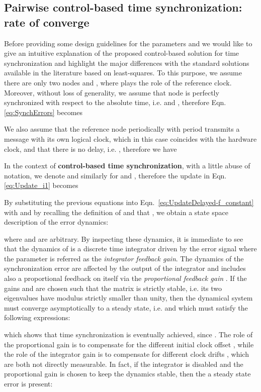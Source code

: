 \documentclass[english,a4paper,10pt,final]{article}
\numberwithin{equation}{section}
\numberwithin{figure}{section}
\begin{document}
\subsection{Pairwise control-based time synchronization: rate of converge}
\label{subsec:pairwise_control}

Before providing some design guidelines for the parameters  and  we would like to give an intuitive explanation of the proposed control-based solution for time synchronization and highlight the major differences with the standard solutions available in the literature based on least-squares. To this purpose, we assume there are only two nodes  and , where  plays the role of the reference clock. Moreover, without loss of generality, we assume that node  is perfectly synchronized with respect to the absolute time, i.e.  and , therefore Eqn.\eqref{eq:SynchErrors} becomes

We also assume that the reference node  periodically with period  transmits a message with its own logical clock, which in this case coincides with the hardware clock, and that there is no delay, i.e. , therefore we have



In the context of \textbf{control-based time synchronization}, with a little abuse of notation, we denote  and similarly for  and , therefore the update in Eqn.\eqref{eq:Update_i1} becomes

By substituting the previous equations into Eqn.~\ref{eq:UpdateDelayed-f_constant} with  and by recalling the definition of  and that , we obtain a state space description of the error dynamics:


where  and  are arbitrary. By inspecting these dynamics, it is immediate to see that the dynamics of  is a discrete time integrator driven by the error signal  where the parameter  is referred as the \emph{integrator feedback gain}. The dynamics of the synchronization error  are affected by the output of the integrator  and includes also a proportional feedback on itself via the \emph{proportional feedback gain} . If the gains  and  are chosen such that the matrix  is strictly stable, i.e. its two eigenvalues have modulus strictly smaller than unity, then the dynamical system must converge asymptotically to a steady state, i.e.  and  which must satisfy the following expressions:

which shows that time synchronization is eventually achieved, since . The role of the proportional gain is to compensate for the different initial clock offset , while the role of the integrator gain is to compensate for different clock drifts , which are both not directly measurable. In fact, if the integrator is disabled and the proportional gain is chosen to keep the dynamics stable, then the a steady state error is present:
\end{document}
